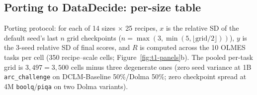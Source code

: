 \subsection{Porting to DataDecide: per-size table}
\label{app:t1-port}

Porting protocol: for each of 14 sizes $\times$ 25 recipes, $x$ is the relative SD
of the default seed's last $n$ grid checkpoints ($n = \max(3, \min(5, \lfloor \mathrm{grid}/2 \rfloor))$), $y$ is the 3-seed relative SD of final scores, and $R$ is computed across the 10 OLMES
tasks per cell (350 recipe--scale cells; Figure~\ref{fig:t1-panels}b). The pooled per-task grid is
$3{,}497 = 3{,}500$ cells minus three degenerate ones (zero seed variance at 1B
\texttt{arc\_challenge} on DCLM-Baseline 50\%/Dolma 50\%; zero checkpoint spread at 4M
\texttt{boolq}/\texttt{piqa} on two Dolma variants).

